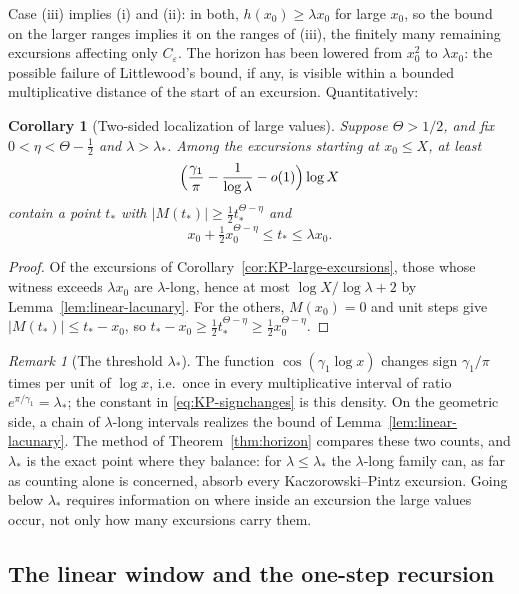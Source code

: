 \documentclass[11pt]{amsart}
\numberwithin{equation}{section}
\theoremstyle{plain}
\newtheorem{corollary}[theorem]{Corollary}
\theoremstyle{definition}
\theoremstyle{remark}
\newtheorem{remark}[theorem]{Remark}
\newcommand{\eps}{\varepsilon}
\begin{document}
Case (iii) implies (i) and (ii): in both, $h(x_0)\ge\lambda x_0$ for large
$x_0$, so the bound on the larger ranges implies it on the ranges of (iii),
the finitely many remaining excursions affecting only $C_\eps$. The horizon has
been lowered from $x_0^2$ to $\lambda x_0$: the possible failure of
Littlewood's bound, if any, is visible within a bounded multiplicative
distance of the start of an excursion. Quantitatively:

\begin{corollary}[Two-sided localization of large values]
\label{cor:two-sided}
Suppose $\Theta>1/2$, and fix $0<\eta<\Theta-\frac12$ and $\lambda>\lambda_*$.
Among the excursions starting at $x_0\le X$, at least
\[
\Bigl(\frac{\gamma_1}{\pi}-\frac1{\log\lambda}-o(1)\Bigr)\log X
\]
contain a point $t_*$ with $|M(t_*)|\ge\frac12t_*^{\Theta-\eta}$ and
\[
x_0+\tfrac12x_0^{\Theta-\eta}\le t_*\le\lambda x_0 .
\]
\end{corollary}

\begin{proof}
Of the excursions of Corollary~\ref{cor:KP-large-excursions}, those whose
witness exceeds $\lambda x_0$ are $\lambda$-long, hence at most
$\log X/\log\lambda+2$ by Lemma~\ref{lem:linear-lacunary}. For the others,
$M(x_0)=0$ and unit steps give $|M(t_*)|\le t_*-x_0$, so
$t_*-x_0\ge\frac12t_*^{\Theta-\eta}\ge\frac12x_0^{\Theta-\eta}$.
\end{proof}

\begin{remark}[The threshold $\lambda_*$]
\label{rem:lambda-star}
The function $\cos(\gamma_1\log x)$ changes sign $\gamma_1/\pi$ times per
unit of $\log x$, i.e.\ once in every multiplicative interval of ratio
$e^{\pi/\gamma_1}=\lambda_*$; the constant in \eqref{eq:KP-signchanges} is
this density. On the geometric side, a chain of $\lambda$-long intervals
realizes the bound of Lemma~\ref{lem:linear-lacunary}. The method of
Theorem~\ref{thm:horizon} compares these two counts, and $\lambda_*$ is the
exact point where they balance: for $\lambda\le\lambda_*$ the $\lambda$-long
family can, as far as counting alone is concerned, absorb every
Kaczorowski--Pintz excursion. Going below $\lambda_*$ requires information
on where inside an excursion the large values occur, not only how many
excursions carry them.
\end{remark}

\subsection{The linear window and the one-step recursion}
\label{subsec:linear-window}
\end{document}
